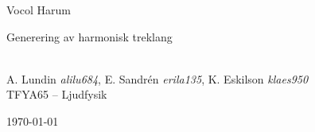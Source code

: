 \begin{titlepage}
\begin{center}

{ \huge  Vocol Harum \\[0.4cm] }

\large Generering av harmonisk treklang

\HRule \\[1.5cm]

A. Lundin
\emph{alilu684},
E. Sandrén
\emph{erila135},
K. Eskilson
\emph{klaes950}\\[1.5cm]

TFYA65 – Ljudfysik

\vfill

{\large \today}

\end{center}
\end{titlepage}
